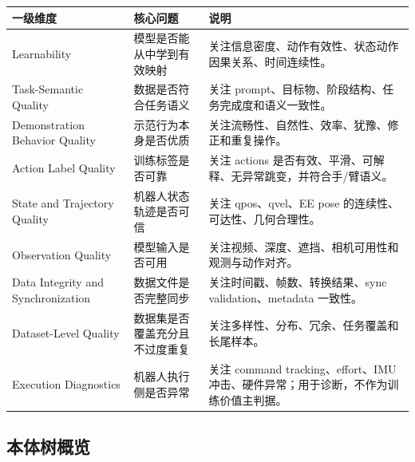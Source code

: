 \documentclass[UTF8,zihao=-4,oneside,openany]{ctexrep}
\begin{document}
\begin{longtable}{L{3.2cm} L{4.2cm} L{6.2cm}}
\toprule
一级维度 & 核心问题 & 说明 \\
\midrule
Learnability & 模型是否能从中学到有效映射 & 关注信息密度、动作有效性、状态动作因果关系、时间连续性。 \\
Task-Semantic Quality & 数据是否符合任务语义 & 关注 prompt、目标物、阶段结构、任务完成度和语义一致性。 \\
Demonstration Behavior Quality & 示范行为本身是否优质 & 关注流畅性、自然性、效率、犹豫、修正和重复操作。 \\
Action Label Quality & 训练标签是否可靠 & 关注 actions 是否有效、平滑、可解释、无异常跳变，并符合手/臂语义。 \\
State and Trajectory Quality & 机器人状态轨迹是否可信 & 关注 qpos、qvel、EE pose 的连续性、可达性、几何合理性。 \\
Observation Quality & 模型输入是否可用 & 关注视频、深度、遮挡、相机可用性和观测与动作对齐。 \\
Data Integrity and Synchronization & 数据文件是否完整同步 & 关注时间戳、帧数、转换结果、sync validation、metadata 一致性。 \\
Dataset-Level Quality & 数据集是否覆盖充分且不过度重复 & 关注多样性、分布、冗余、任务覆盖和长尾样本。 \\
Execution Diagnostics & 机器人执行侧是否异常 & 关注 command tracking、effort、IMU 冲击、硬件异常；用于诊断，不作为训练价值主判据。 \\
\bottomrule
\end{longtable}

\subsection{本体树概览}
\end{document}
